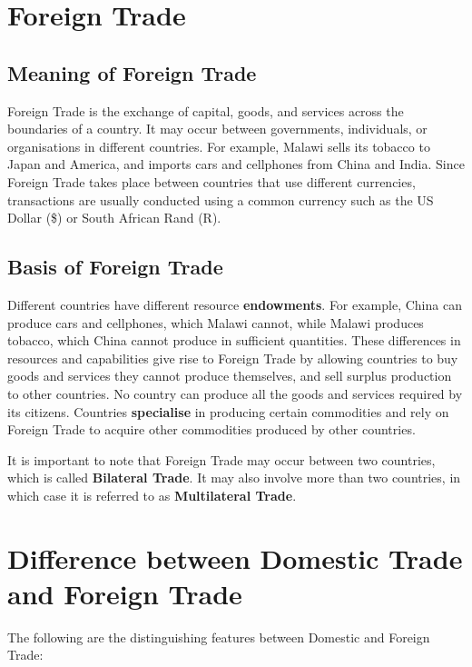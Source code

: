 \documentclass[12pt,a4paper, openany]{book}
\begin{document}
\section{Foreign Trade}

\subsection{Meaning of Foreign Trade}
Foreign Trade is the exchange of capital, goods, and services across the boundaries of a country.
It may occur between governments, individuals, or organisations in different countries.
For example, Malawi sells its tobacco to Japan and America, and imports cars and cellphones from China and India.
Since Foreign Trade takes place between countries that use different currencies, transactions are usually conducted using a common currency such as the US Dollar (\$) or South African Rand (R).

\subsection{Basis of Foreign Trade}
Different countries have different resource \textbf{endowments}.
For example, China can produce cars and cellphones, which Malawi cannot, while Malawi produces tobacco, which China cannot produce in sufficient quantities.
These differences in resources and capabilities give rise to Foreign Trade by allowing countries to buy goods and services they cannot produce themselves, and sell surplus production to other countries.
No country can produce all the goods and services required by its citizens.
Countries \textbf{specialise} in producing certain commodities and rely on Foreign Trade to acquire other commodities produced by other countries.

\vspace{0.5cm}

It is important to note that Foreign Trade may occur between two countries, which is called \textbf{Bilateral Trade}.
It may also involve more than two countries, in which case it is referred to as \textbf{Multilateral Trade}.

\section{Difference between Domestic Trade and Foreign Trade}
The following are the distinguishing features between Domestic and Foreign Trade:
\end{document}

